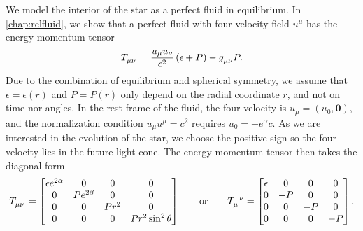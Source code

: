 We model the interior of the star as a perfect fluid in equilibrium.
In \cref{chap:relfluid}, we show that a perfect fluid with four-velocity field $u^\mu$ has the energy-momentum tensor
\begin{equation}
	T\indices{_\mu_\nu} = \frac{u_\mu u_\nu}{c^2} \left( \epsilon + P \right)  - g\indices{_\mu_\nu} P .
	\label{eq:tov:energy_momentum_perfect_fluid}
\end{equation}
Due to the combination of equilibrium and spherical symmetry, we assume that $\epsilon = \epsilon(r)$ and $P = P(r)$ only depend on the radial coordinate $r$, and not on time nor angles.
In the rest frame of the fluid, the four-velocity is $u_\mu = (u_0, \textbf{0})$, and the normalization condition $u_\mu u^\mu = c^2$ requires $u_0 = \pm e^\alpha c$.
As we are interested in the evolution of the star, we choose the positive sign so the four-velocity lies in the future light cone.
The energy-momentum tensor then takes the diagonal form
\begin{equation}
T\indices{_\mu_\nu} =
\begin{bmatrix}
	\epsilon e^{2\alpha} & 0            & 0     & 0                   \\
	0                    & P e^{2\beta} & 0     & 0                   \\
	0                    & 0            & P r^2 & 0                   \\
	0                    & 0            & 0     & P r^2 \sin^2 \theta \\
\end{bmatrix}
\qquad \text{or} \qquad
T\indices{_\mu^\nu} =
\begin{bmatrix}
	\epsilon &  0 &  0 &  0 \\
	0        & -P &  0 &  0 \\
	0        &  0 & -P &  0 \\
	0        &  0 &  0 & -P \\
\end{bmatrix}
.
\label{eq:einstein_to_tov:T}
\end{equation}

